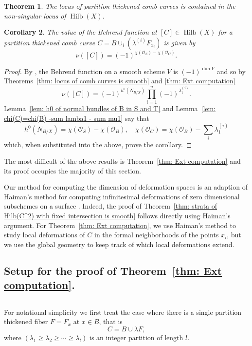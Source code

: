 \documentclass[12pt]{amsart}
\newtheorem{theorem}{Theorem}%
\newtheorem{corollary}[theorem]{Corollary}
\theoremstyle{definition}
\renewcommand{\O}{\mathcal{O}}
\newcommand{\Hilb}{\operatorname{Hilb}}
\newcommand{\SubSecSpace}{$\,$\vspace{0.2cm}\par } %
\begin{document}
\begin{theorem}\label{thm: locus of comb curves is smooth}
The locus of partition thickened comb curves is contained in the
non-singular locus of $\Hilb (X)$.
\end{theorem}

\begin{corollary}\label{cor: value of Behrend function at comb curves}
The value of the Behrend function at $[C]\in \Hilb (X)$ for a
partition thickened comb curve $C =
B\cup_{i}\left(\lambda^{(i)}F_{x_{i}} \right)$ is given by
\[
\nu ([C]) = (-1)^{\chi (\O_{S})-\chi (\O_{C})}.
\]
\end{corollary}
\begin{proof}
By \cite{Behrend-micro}, the Behrend function on a smooth scheme $V$
is $(-1)^{\dim V}$ and so by Theorems~\ref{thm: locus of comb curves
is smooth} and \ref{thm: Ext computation}
\[
\nu ([C]) = (-1)^{h^{0}(N_{B/X}) }\prod_{i=1}^{n} (-1)^{\lambda_{1}^{(i)}}. 
\]
Lemma~\ref{lem: h0 of normal bundles of B in S and T} and
Lemma~\ref{lem: chi(C)=chi(B) -sum lamba1 - sum mu1} say that
\[
h^{0}(N_{B/X}) = \chi (\O_{S}) - \chi (\O_{B}), \quad \chi (\O_{C}) =
\chi(\O_{B}) - \sum_{i} \lambda^{(i)}_{1}
\]
which, when substituted into the above, prove the corollary. 
\end{proof}
The most difficult of the above results is Theorem~\ref{thm: Ext
computation} and its proof occupies the majority of this section.

Our method for computing the dimension of deformation spaces is an
adaption of Haiman's method for computing infinitesimal deformations
of zero dimensional subschemes on a surface \cite{Haiman1998}. Indeed,
the proof of Theorem~\ref{thm: strata of Hilb(C^2) with fixed
intersection is smooth} follows directly using Haiman's argument. For
Theorem~\ref{thm: Ext computation}, we use Haiman's method to study
local deformations of $C$ in the formal neighborhoods of the points
$x_{i}$, but we use the global geometry to keep track of which local
deformations extend.

\subsection{Setup for the proof of Theorem~\ref{thm: Ext
computation}.}\SubSecSpace 

For notational simplicity we first treat the case where there is a
single partition thickened fiber $F=F_{x}$ at $x\in B$, that is
\[
C=B\cup \lambda F,
\]
where $(\lambda_{1}\geq \lambda_{2}\geq \dotsb \geq \lambda_{l})$ is
an integer partition of length $l$.
\end{document}
